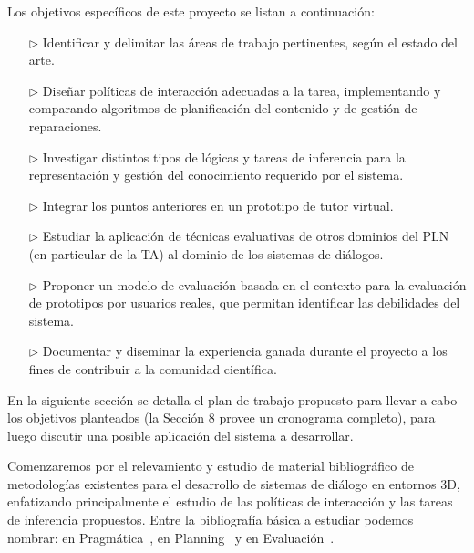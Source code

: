 Los objetivos espec\'ificos de este proyecto se listan a continuaci\'on:

\begin{itemize}
    \item[$\triangleright$] Identificar y delimitar las \'areas de trabajo
pertinentes, seg\'un el estado del arte.\\[-2em]
    \item[$\triangleright$] Dise\~nar pol\'iticas de interacci\'on adecuadas
a la
tarea, implementando y comparando algoritmos de planificaci\'on del contenido y
de gesti\'on de reparaciones.\\[-2em]
    \item[$\triangleright$] Investigar
distintos tipos de l\'ogicas y tareas de inferencia para la representaci\'on
y gesti\'on del conoci\-mien\-to requerido por el sistema.\\[-2em]
    \item[$\triangleright$] Integrar los puntos anteriores en un prototipo de tutor virtual.\\[-2em]
    \item[$\triangleright$] Estudiar la
aplicaci\'on de t\'ecnicas evaluativas de otros dominios del PLN (en particular
de la TA) al dominio de los sistemas de di\'alogos.\\[-2em]
    \item[$\triangleright$] Proponer un modelo de evaluaci\'on basada en el
contexto para la evaluaci\'on de prototipos por usuarios reales,
que permitan identificar las debilidades del sistema.\\[-2em]
    \item[$\triangleright$] Documentar y diseminar la experiencia ganada durante
el proyecto a los fines de contribuir a la comunidad cient\'ifica.
\end{itemize}

En la siguiente secci\'on se detalla el plan de trabajo propuesto para llevar a
cabo los objetivos planteados (la Secci\'on 8
provee un cronograma completo), para luego discutir una posible aplicaci\'on del
sistema a desarrollar.


Comenzaremos por el relevamiento y estudio de material
bibliogr\'afico de metodolo\-g\'ias existentes para el desarrollo de sistemas de di\'alogo
 en entornos 3D, enfatizando principalmente el estudio de las pol\'iticas de
interacci\'on y las tareas de inferencia propuestos. Entre la bibliograf\'ia b\'asica a
estudiar podemos nombrar:
en Pragm\'atica~\citep{grice75,clark96,kehler04,devault08,ginzburg09},
en Planning~\citep{kautz99,hoffmann01,nau04,petrick06} y 
en Evaluaci\'on~\citep{Jones96, EAG96, Dybkjaer07, Petrie09}.



